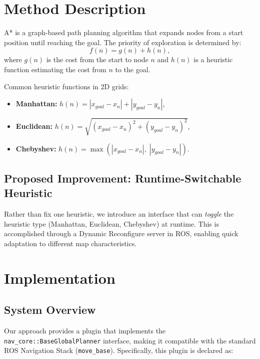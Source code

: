 \documentclass[letterpaper, 10 pt, conference]{ieeeconf}
\begin{document}
\section{Method Description}\label{sec:method}
A* \cite{hart1968formal} is a graph-based path planning algorithm that expands 
nodes from a start position until reaching the goal. The priority of exploration 
is determined by:
\begin{equation}
f(n) = g(n) + h(n),
\end{equation}
where $g(n)$ is the cost from the start to node $n$ and $h(n)$ is a heuristic 
function estimating the cost from $n$ to the goal. 

Common heuristic functions in 2D grids:
\begin{itemize}
    \item \textbf{Manhattan:} $h(n) = |x_{goal} - x_n| + |y_{goal} - y_n|$,
    \item \textbf{Euclidean:} $h(n) = \sqrt{(x_{goal}-x_n)^2 + (y_{goal}-y_n)^2}$,
    \item \textbf{Chebyshev:} $h(n) = \max(|x_{goal} - x_n|,\; |y_{goal} - y_n|).$
\end{itemize}

\subsection{Proposed Improvement: Runtime-Switchable Heuristic}
Rather than fix one heuristic, we introduce an interface that can \textit{toggle} 
the heuristic type (Manhattan, Euclidean, Chebyshev) at runtime. This is accomplished 
through a Dynamic Reconfigure server in ROS, enabling quick adaptation to different 
map characteristics.



\section{Implementation}\label{sec:implementation}

\subsection{System Overview}
Our approach provides a plugin that implements the \texttt{nav\_core::BaseGlobalPlanner} interface, making it compatible with the standard ROS Navigation Stack (\texttt{move\_base}). Specifically, this plugin is declared as:
\end{document}
